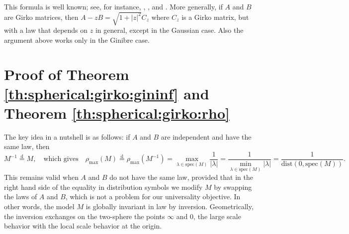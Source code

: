\documentclass[10pt,reqno]{amsart}
\newcommand{\dd}{\mathrm{d}}
\newcommand{\<}{\langle}
\renewcommand{\>}{\rangle}
\numberwithin{equation}{section}
\begin{document}
This formula is well known; see, for instance, \cite{MR2489167}, \cite{zbMATH06425285}, and \cite{zbMATH06125015}. More generally, if $A$ and $B$ are Girko matrices, then $A-zB=\sqrt{1+|z|^2}C_z$ where $C_z$ is a Girko matrix, but with a law that depends on $z$ in general, except in the Gaussian case. Also the argument above works only in the Ginibre case.

%
\section{Proof of Theorem \ref{th:spherical:girko:gininf} and Theorem \ref{th:spherical:girko:rho}}
\label{se:proof:th:spherical:girko:gininf+rho}
%

The key idea in a nutshell is as follows: if $A$ and $B$ are independent and have the same law, then
\begin{equation}\label{eq:sphere:rho:inverse}
    M^{-1}\overset{\dd}{=}M,\quad\text{which gives}
    \quad\rho_{\max}(M)\overset{\dd}{=}\rho_{\max}(M^{-1})
    =\max_{\lambda\in\mathrm{spec}(M)}\frac{1}{|\lambda|}
    =\frac{1}{\min_{\lambda\in\mathrm{spec}(M)}|\lambda|}
    =\frac{1}{\mathrm{dist}(0,\mathrm{spec}(M))}.
\end{equation}
This remains valid when $A$ and $B$ do not have the same law, provided that in the right hand side of the equality in distribution symbols we modify $M$ by swapping the laws of $A$ and $B$, which is not a problem for our universality objective. In other words, the model $M$ is globally invariant in law by inversion. Geometrically, the inversion exchanges on the two-sphere the points $\infty$ and $0$, the large scale behavior with the local scale behavior at the origin.
\end{document}
